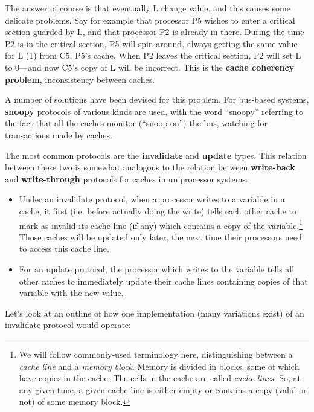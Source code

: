 The answer of course is that eventually L  change value,
and this causes some delicate problems. Say for example that processor
P5 wishes to enter a critical section guarded by L, and that processor
P2 is already in there. During the time P2 is in the critical section,
P5 will spin around, always getting the same value for L (1) from C5,
P5's cache. When P2 leaves the critical section, P2 will set L to
0---and now C5's copy of L will be incorrect. This is the \textbf{cache
coherency problem}, inconsistency between caches.

A number of solutions have been devised for this problem. For bus-based
systems, \textbf{snoopy} protocols of various kinds are used, with the
word ``snoopy'' referring to the fact that all the caches monitor
(``snoop on'') the bus, watching for transactions made by
 caches.

The most common protocols are the \textbf{invalidate} and
\textbf{update} types.  This relation between these two is somewhat
analogous to the relation between \textbf{write-back} and
\textbf{write-through} protocols for caches in uniprocessor systems:

\begin{itemize}

\item Under an invalidate protocol, when a processor writes to a
variable in a cache, it first (i.e. before actually doing the write)
tells each other cache to mark as invalid its cache line (if any) which
contains a copy of the variable.\footnote{We will follow commonly-used
terminology here, distinguishing between a {\it cache line} and a {\it
memory block}.  Memory is divided in blocks, some of which have copies
in the cache.  The cells in the cache are called {\it cache lines}.  So,
at any given time, a given cache line is either empty or contains a copy
(valid or not) of some memory block.} Those caches will be updated only
later, the next time their processors need to access this cache line.

\item For an update protocol, the processor which writes to the variable
tells all other caches to immediately update their cache lines
containing copies of that variable with the new value.

\end{itemize}

Let's look at an outline of how one implementation (many variations exist)
of an invalidate protocol would operate:


